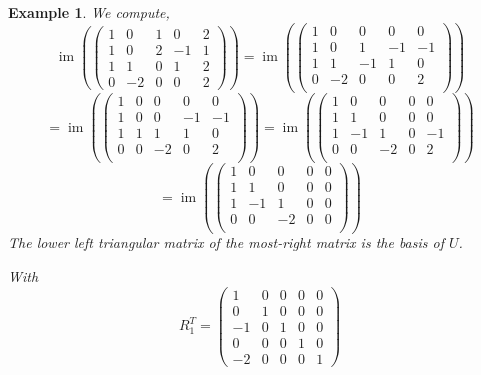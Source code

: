 \documentclass[a4paper,landscape,twocolumn]{article}
\newtheorem{ex}{Example}
\DeclareMathOperator\image{im} %
\begin{document}
\begin{ex}
  We compute,
  \[
    \image\left(
      \begin{pmatrix}
        1 & 0 & 1 & 0 & 2 \\
        1 & 0 & 2 & -1 & 1 \\
        1 & 1 & 0 & 1 & 2 \\
        0 & -2 & 0 & 0 & 2
      \end{pmatrix}
    \right) = \image\left(
      \begin{pmatrix}
        1 & 0 & 0 & 0 & 0 \\
        1 & 0 & 1 & -1 & -1 \\
        1 & 1 & -1 & 1 & 0 \\
        0 & -2 & 0 & 0 & 2 \\
      \end{pmatrix}
    \right)
  \] \[
    = \image\left(
      \begin{pmatrix}
        1 & 0 & 0 & 0 & 0 \\
        1 & 0 & 0 & -1 & -1 \\
        1 & 1 & 1 & 1 & 0 \\
        0 & 0 & -2 & 0 & 2 \\
      \end{pmatrix}
    \right) = \image\left(
      \begin{pmatrix}
        1 & 0 & 0 & 0 & 0 \\
        1 & 1 & 0 & 0 & 0 \\
        1 & -1 & 1 & 0 & -1 \\
        0 & 0 & -2 & 0 & 2 \\
      \end{pmatrix}
    \right)
  \] \[
    = \image\left(
      \begin{pmatrix}
        1 & 0 & 0 & 0 & 0 \\
        1 & 1 & 0 & 0 & 0 \\
        1 & -1 & 1 & 0 & 0 \\
        0 & 0 & -2 & 0 & 0 \\
      \end{pmatrix}
    \right)
  \]
  The lower left triangular matrix of the most-right matrix
  is the basis of $U$.

  With
  \[
    R_1^T = \begin{pmatrix}
       1 & 0 & 0 & 0 & 0 \\
       0 & 1 & 0 & 0 & 0 \\
      -1 & 0 & 1 & 0 & 0 \\
       0 & 0 & 0 & 1 & 0 \\
      -2 & 0 & 0 & 0 & 1
    \end{pmatrix}
  \]
\end{ex}
\end{document}

